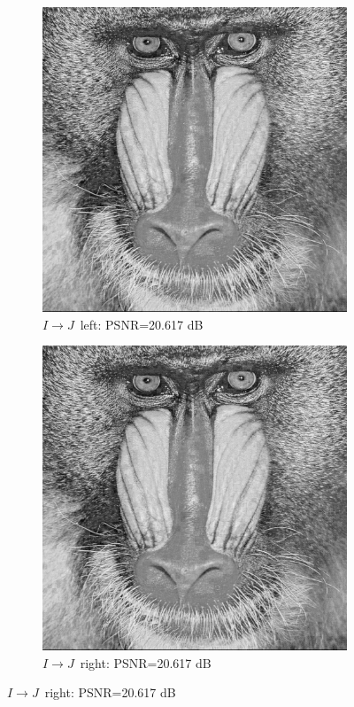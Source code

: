 \documentclass[10pt,twoside,titlepage]{article}
\newcommand{\sysIJ}{\mbox{$I \rightarrow J$}}
\begin{document}
\begin{figure}
    \centering
    \begin{subfigure}{0.5\textwidth}
        \centering
        \includegraphics[width=0.6\linewidth]{img/baboon_ij_left.png}
        \caption{\sysIJ\ left: PSNR=20.617 dB}
    \end{subfigure}%
    \begin{subfigure}{0.5\textwidth}
        \centering
        \includegraphics[width=0.6\linewidth]{img/baboon_ij_right.png}
        \caption{\sysIJ\ right: PSNR=20.617 dB}
    \end{subfigure}
    \label{fig:baboon_ij}


\end{figure}
\end{document}
